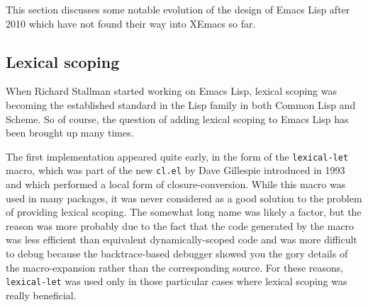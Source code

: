 \documentclass[format=acmsmall, review]{acmart}
\newcommand \Elisp {Emacs Lisp}
\begin{document}
This section discusses some notable evolution of the design of
\Elisp{} after 2010 which have not found their way into XEmacs so far.

\subsection{Lexical scoping}
\label{sec:lexical-scoping}

When Richard Stallman started working on \Elisp, lexical scoping
was becoming the established standard in the Lisp family in both
Common Lisp and Scheme.  So of course, the question of adding lexical
scoping to \Elisp{} has been brought up many times.

The first implementation appeared quite early, in the form of the
\texttt{lexical-let} macro, which was part of the new \texttt{cl.el} by Dave
Gillespie  introduced in 1993 and which
performed a local form of closure-conversion.
While this macro was used in many packages, it was never considered as
a good solution to the problem of providing lexical scoping.
The somewhat long name was likely a factor, but the reason was more probably
due to the fact that the code generated by the macro was less efficient than
equivalent dynamically-scoped code and was more difficult to debug because
the backtrace-based debugger showed you the gory details of the
macro-expansion rather than the corresponding source.  For these reasons,
\texttt{lexical-let} was used only in those particular cases where lexical
scoping was really beneficial.
\end{document}
